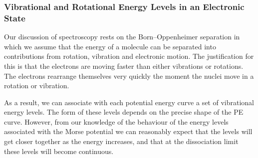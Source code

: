 \documentclass{article}
\theoremstyle{plain}\theoremheaderfont{\normalfont\itshape}\theorembodyfont{\rmfamily}\theoremseparator{.}\newtheorem*{rem}{Remark}\newtheorem*{ex}{Example}\newtheorem*{proof}{Proof}\newtheorem*{altp}{Alternative proof}
\theoremstyle{plain}\theoremheaderfont{\normalfont\bfseries}\theorembodyfont{\rmfamily}\theoremseparator{.}\newtheorem{thm}{Theorem}[section]\newtheorem{lem}[thm]{Lemma}\newtheorem{prop}[thm]{Proposition}\newtheorem*{cor}{Corollary}\newtheorem{defn}[thm]{Definition}\newtheorem{clm}[thm]{Claim}\newtheorem{clminproof}{Claim}\newtheorem{pos}{Postulate}[section]
\theoremstyle{break}\theoremheaderfont{\normalfont\itshape}\theorembodyfont{\rmfamily}\theoremseparator{.\medskip}\newtheorem*{proofskip}{Proof}\newtheorem*{exs}{Examples}\newtheorem*{rems}{Remarks}
\theoremstyle{break}\theoremheaderfont{\normalfont\bfseries}\theorembodyfont{\rmfamily}\theoremseparator{.\medskip}\newtheorem{lemskip}[thm]{Lemma}\newtheorem{defnskip}[thm]{Definition}\newtheorem{propskip}[thm]{Proposition}\newtheorem{thmskip}[thm]{Theorem}
\numberwithin{equation}{section}
\begin{document}
    \subsubsection{Vibrational and Rotational Energy Levels in an Electronic State}
    Our discussion of spectroscopy rests on the Born--Oppenheimer separation in which we assume that the energy of a molecule can be separated into contributions from rotation, vibration and electronic motion. The justification for this is that the electrons are moving faster than either vibrations or rotations. The electrons rearrange themselves very quickly the moment the nuclei move in a rotation or vibration.

    As a result, we can associate with each potential energy curve a set of vibrational energy levels. The form of these levels depends on the precise shape of the PE curve. However, from our knowledge of the behaviour of the energy levels associated with the Morse potential we can reasonably expect that the levels will get closer together as the energy increases, and that at the dissociation limit these levels will become continuous.

    \begin{figure}[ht!]
        \centering
    \end{figure}
\end{document}
